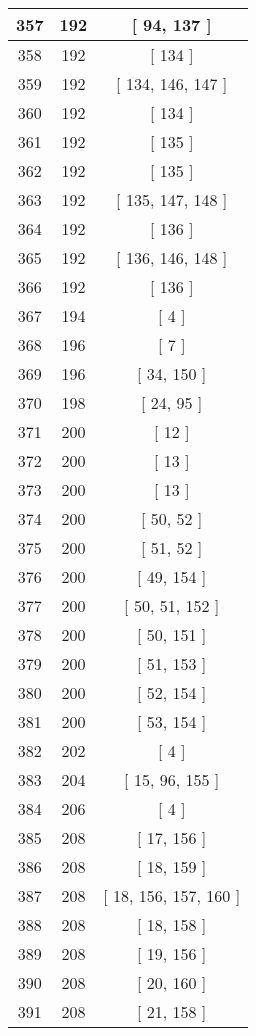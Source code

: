 \begin{center}
\begin{longtable}[H]{|| c c c ||}
\hline
357 & 192 & [ 94, 137 ] \\ 
\hline
358 & 192 & [ 134 ] \\ 
\hline
359 & 192 & [ 134, 146, 147 ] \\ 
\hline
360 & 192 & [ 134 ] \\ 
\hline
361 & 192 & [ 135 ] \\ 
\hline
362 & 192 & [ 135 ] \\ 
\hline
363 & 192 & [ 135, 147, 148 ] \\ 
\hline
364 & 192 & [ 136 ] \\ 
\hline
365 & 192 & [ 136, 146, 148 ] \\ 
\hline
366 & 192 & [ 136 ] \\ 
\hline
367 & 194 & [ 4 ] \\ 
\hline
368 & 196 & [ 7 ] \\ 
\hline
369 & 196 & [ 34, 150 ] \\ 
\hline
370 & 198 & [ 24, 95 ] \\ 
\hline
371 & 200 & [ 12 ] \\ 
\hline
372 & 200 & [ 13 ] \\ 
\hline
373 & 200 & [ 13 ] \\ 
\hline
374 & 200 & [ 50, 52 ] \\ 
\hline
375 & 200 & [ 51, 52 ] \\ 
\hline
376 & 200 & [ 49, 154 ] \\ 
\hline
377 & 200 & [ 50, 51, 152 ] \\ 
\hline
378 & 200 & [ 50, 151 ] \\ 
\hline
379 & 200 & [ 51, 153 ] \\ 
\hline
380 & 200 & [ 52, 154 ] \\ 
\hline
381 & 200 & [ 53, 154 ] \\ 
\hline
382 & 202 & [ 4 ] \\ 
\hline
383 & 204 & [ 15, 96, 155 ] \\ 
\hline
384 & 206 & [ 4 ] \\ 
\hline
385 & 208 & [ 17, 156 ] \\ 
\hline
386 & 208 & [ 18, 159 ] \\ 
\hline
387 & 208 & [ 18, 156, 157, 160 ] \\ 
\hline
388 & 208 & [ 18, 158 ] \\ 
\hline
389 & 208 & [ 19, 156 ] \\ 
\hline
390 & 208 & [ 20, 160 ] \\ 
\hline
391 & 208 & [ 21, 158 ] \\ 
\hline

\end{longtable}
\end{center}
